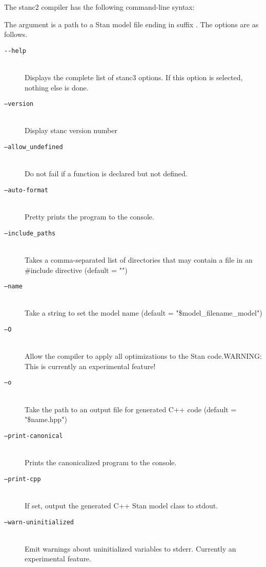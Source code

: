 The stanc2 compiler has the following command-line syntax:
%
\begin{quote}
\end{quote}
%
The argument  is a path to a Stan model
file ending in suffix .  The options are as follows.
%
\begin{description}
%
\item[\tt {-}-help] 
\mbox{ } \\ 
Displays the complete list of stanc3 options.
If this option is selected, nothing else is done.
%
\item[\tt  --version]
\mbox{ } \\ 
 Display stanc version number
%
\item[\tt  --allow\_undefined]
\mbox{ } \\ 
Do not fail if a function is declared but not defined.
%
\item[\tt --auto-format]
\mbox{ } \\ 
 Pretty prints the program to the console.
%
\item[\tt  --include\_paths]
\mbox{ } \\ 
Takes a comma-separated list of directories that may contain a file in an \#include directive (default = "")
%
\item[\tt  --name]
\mbox{ } \\ 
Take a string to set the model name (default = "\$model\_filename\_model")
%
\item[\tt  --O ]
\mbox{ } \\ 
Allow the compiler to apply all optimizations to the Stan code.WARNING: This is currently an experimental feature!
%
\item[\tt  --o]
\mbox{} \\
Take the path to an output file for generated C++ code (default = "\$name.hpp")

%
\item[\tt  --print-canonical]
\mbox{ } \\ 
 Prints the canonicalized program to the console.

%
\item[\tt  --print-cpp]
\mbox{ } \\ 
If set, output the generated C++ Stan model class to stdout.

%
\item[\tt  --warn-uninitialized]
\mbox{ } \\ 
Emit warnings about uninitialized variables to stderr. Currently an experimental feature.


\end{description}
